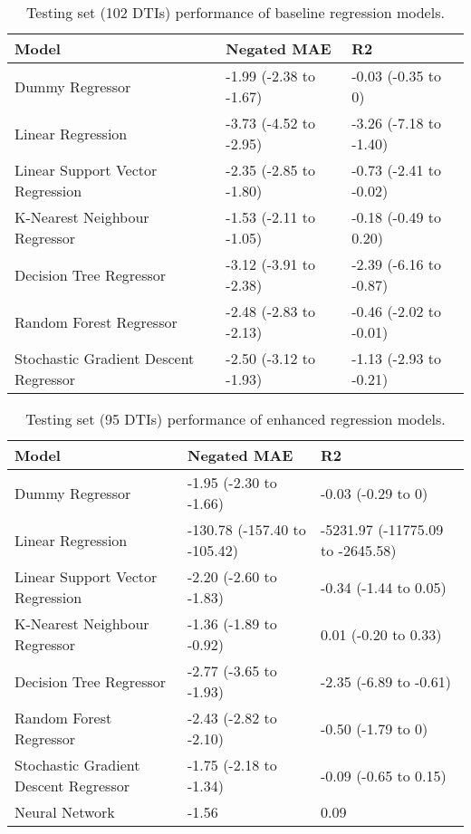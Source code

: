 \begin{table*}
    \centering
    \begin{tabular}{lll}
    \toprule
                                    Model & Negated MAE &                     R2 \\
    \midrule
                          Dummy Regressor &      -1.99 (-2.38 to -1.67) &     -0.03 (-0.35 to 0) \\
                        Linear Regression &      -3.73 (-4.52 to -2.95) & -3.26 (-7.18 to -1.40) \\
         Linear Support Vector Regression &      -2.35 (-2.85 to -1.80) & -0.73 (-2.41 to -0.02) \\
            K-Nearest Neighbour Regressor &      -1.53 (-2.11 to -1.05) &  -0.18 (-0.49 to 0.20) \\
                  Decision Tree Regressor &      -3.12 (-3.91 to -2.38) & -2.39 (-6.16 to -0.87) \\
                  Random Forest Regressor &      -2.48 (-2.83 to -2.13) & -0.46 (-2.02 to -0.01) \\
    Stochastic Gradient Descent Regressor &      -2.50 (-3.12 to -1.93) & -1.13 (-2.93 to -0.21) \\
    \bottomrule
    \end{tabular}
    \caption{Testing set (102 DTIs) performance of baseline regression models.}
    \label{tbl:baseline_regression}
\end{table*}

\begin{table*}
    \centering
    \begin{tabular}{lll}
    \toprule
                                    Model &  Negated MAE &                               R2 \\
    \midrule
                          Dummy Regressor &       -1.95 (-2.30 to -1.66) &               -0.03 (-0.29 to 0) \\
                        Linear Regression & -130.78 (-157.40 to -105.42) & -5231.97 (-11775.09 to -2645.58) \\
         Linear Support Vector Regression &       -2.20 (-2.60 to -1.83) &            -0.34 (-1.44 to 0.05) \\
            K-Nearest Neighbour Regressor &       -1.36 (-1.89 to -0.92) &             0.01 (-0.20 to 0.33) \\
                  Decision Tree Regressor &       -2.77 (-3.65 to -1.93) &           -2.35 (-6.89 to -0.61) \\
                  Random Forest Regressor &       -2.43 (-2.82 to -2.10) &               -0.50 (-1.79 to 0) \\
    Stochastic Gradient Descent Regressor &       -1.75 (-2.18 to -1.34) &            -0.09 (-0.65 to 0.15) \\
                           Neural Network &                        -1.56 &                             0.09 \\
    \bottomrule
    \end{tabular}
    \caption{Testing set (95 DTIs) performance of enhanced regression models.}
    \label{tbl:enhanced_regression}
\end{table*}

